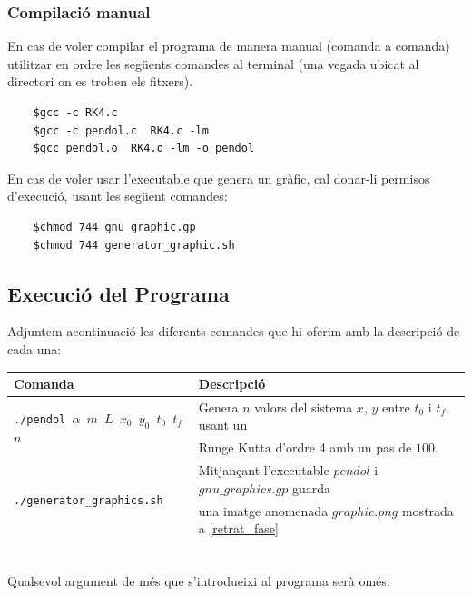 \documentclass[a4paper, 11pt]{article}
\begin{document}
\subsubsection{Compilació manual}
En cas de voler compilar el programa de manera manual (comanda a comanda) utilitzar en ordre les següents comandes al terminal (una vegada ubicat al directori on es troben els fitxers).
\begin{verbatim}
    $gcc -c RK4.c
    $gcc -c pendol.c  RK4.c -lm
    $gcc pendol.o  RK4.o -lm -o pendol
\end{verbatim}
En cas de voler usar l'executable que genera un gràfic, cal donar-li permisos d'execució, usant les següent comandes:
\begin{verbatim}
    $chmod 744 gnu_graphic.gp
    $chmod 744 generator_graphic.sh
\end{verbatim}
\vspace{1.5em}
\subsection{Execució del Programa}
Adjuntem acontinuació les diferents comandes que hi oferim amb la descripció de cada una:
\begin{table}[h]
    \centering
    \begin{tabular}{l|l}
        \textbf{Comanda} & \textbf{Descripció} \\ \hline \hline 
        \multirow{2}{*}{\texttt{./pendol $\alpha$ $m$ $L$ $x_0$ $y_0$ $t_0$ $t_f$ $n$}} & Genera $n$ valors del sistema $x$, $y$ entre $t_0$ i $t_f$ usant un \\
        &  Runge Kutta d'ordre 4 amb un pas de $100$.\\\hline
        \multirow{2}{*}{\texttt{./generator\_graphics.sh}} & Mitjançant l'executable $pendol$ i $gnu\_graphics.gp$ guarda\\
        & una imatge anomenada $graphic.png$ mostrada a \textcolor{blue}{\ref{retrat_fase}}\\\hline
    \end{tabular}
    \label{tab:my_label}
\end{table}\\
\hspace{-1.5em}Qualsevol argument de més que s'introdueixi al programa serà omés.\\\\

\newpage
\end{document}
